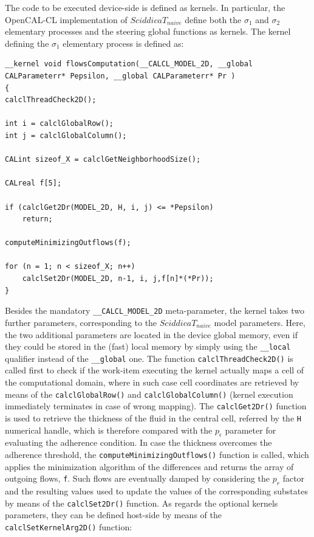 The code to be executed device-side is defined as kernels. In
particular, the OpenCAL-CL implementation of $SciddicaT_{naive}$
define both the $\sigma_1$ and $\sigma_2$ elementary processes and
the steering global functions as kernels. The kernel defining the
$\sigma_1$ elementary process is defined as:
\begin{lstlisting}
__kernel void flowsComputation(__CALCL_MODEL_2D, __global CALParameterr* Pepsilon, __global CALParameterr* Pr )
{
calclThreadCheck2D();

int i = calclGlobalRow();
int j = calclGlobalColumn();

CALint sizeof_X = calclGetNeighborhoodSize();

CALreal f[5];

if (calclGet2Dr(MODEL_2D, H, i, j) <= *Pepsilon)
	return;

computeMinimizingOutflows(f);

for (n = 1; n < sizeof_X; n++)
	calclSet2Dr(MODEL_2D, n-1, i, j,f[n]*(*Pr));
}
\end{lstlisting}

\noindent Besides the mandatory \verb'__CALCL_MODEL_2D'
meta-parameter, the kernel takes two further parameters,
corresponding to the $SciddicaT_{naive}$ model parameters. Here, the
two additional parameters are located in the device global memory,
even if they could be stored in the (fast) local memory by simply
using the \verb'__local' qualifier instead of the \verb'__global'
one. The function \verb'calclThreadCheck2D()' is called first to
check if the work-item executing the kernel actually maps a cell of
the computational domain, where in such case cell coordinates are
retrieved by means of the \verb'calclGlobalRow()' and
\verb'calclGlobalColumn()' (kernel execution immediately terminates
in case of wrong mapping). The \verb'calclGet2Dr()' function is used
to retrieve the thickness of the fluid in the central cell, referred
by the \verb'H' numerical handle, which is therefore compared with
the $p_\epsilon$ parameter for evaluating the adherence
condition. In case the thickness overcomes the adherence threshold,
the \verb'computeMinimizingOutflows()' function is called, which
applies the minimization algorithm of the differences and returns
the array of outgoing flows, \verb'f'. Such flows are eventually
damped by considering the $p_r$ factor and the resulting values used
to update the values of the corresponding substates by means of the
\verb'calclSet2Dr()' function. As regards the optional kernels
parameters, they can be defined host-side by means of the
\verb'calclSetKernelArg2D()' function:


